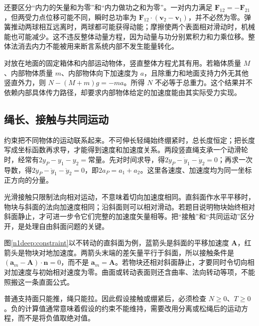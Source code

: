 还要区分“内力的矢量和为零”和“内力做功之和为零”。一对内力满足 $\bm F_{12}=-\bm F_{21}$，但两受力点位移可能不同，瞬时总功率为 $\bm F_{12}\cdot(\bm v_2-\bm v_1)$，并不必然为零。弹簧推动两球相互远离时，两球都可能获得动能；摩擦使两个表面相对滑动时，机械能也可能减少。这不违反整体动量方程，因为动量与功分别累积力和力乘位移。整体法消去内力不能被用来断言系统内部不发生能量转化。

对放在地面的固定箱体和内部运动物体，竖直整体方程尤其有用。若箱体质量 $M$、内部物体质量 $m$、内部物体向下加速度为 $a$，且除重力和地面支持力外无其他竖直外力，则 $N-(M+m)g=-ma$。所得 $N$ 不必等于总重力。这个结果并不依赖内部具体传力路径，却要求内部物体给定的加速度能由其实际受力实现。

\subsection{绳长、接触与共同运动}
约束把不同物体的运动联系起来。不可伸长轻绳始终绷紧时，总长度恒定；把长度写成坐标函数再求导，才能得到速度和加速度关系。两段竖直绳支承一个动滑轮时，经常有$2y_P-y_1-y_2=\text{常量}$。先对时间求导，得$2\dot y_P-\dot y_1-\dot y_2=0$；再求一次导数，得$2\ddot y_P-\ddot y_1-\ddot y_2=0$，即$2a_P=a_1+a_2$。这里各速度、加速度均为同一坐标正方向的分量。

光滑接触只限制法向相对运动，不意味着切向加速度相同。直斜面作水平平移时，物块与斜面的法向加速度相同；沿斜面则可以相对滑动。若题目说明物块始终相对斜面静止，才可进一步令它们完整的加速度矢量相等。把“接触”和“共同运动”区分开，是处理自由斜面问题的关键。

图\ref{n1deep:constraint}以不转动的直斜面为例，蓝箭头是斜面的平移加速度 $\bm A$，红箭头是物块对地加速度。两箭头末端的差矢量平行于斜面，所以接触条件是 $(\bm a_m-\bm A)\cdot\bm n=0$，而不是 $\bm a_m=\bm A$。若物块还相对斜面静止，才要同时令切向相对加速度与初始相对速度为零。曲面或转动表面则还含曲率、法向转动等项，不能照搬这一条直面公式。

普通支持面只能推，绳只能拉。因此假设接触或绷紧后，必须检查 $N\ge0$、$T\ge0$。负的计算值通常意味着假设的约束不能维持，需要改用分离或松绳后的运动方程，而不是将负值取绝对值。

